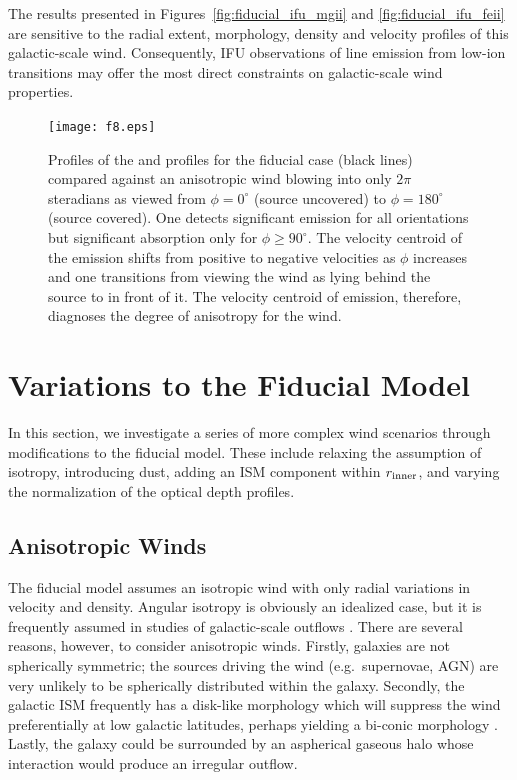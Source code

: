 \documentclass[]{emulateapj}
\begin{document}
The results presented in Figures~\ref{fig:fiducial_ifu_mgii} and
\ref{fig:fiducial_ifu_feii} are sensitive to the radial extent,
morphology, density and velocity profiles of this galactic-scale
wind.  Consequently, IFU observations of line emission from low-ion
transitions may offer the most direct constraints on galactic-scale
wind properties. 

\begin{figure}
\texttt{[image: f8.eps]}
\caption{
Profiles of the  and  profiles for the fiducial
case (black lines) compared against an anisotropic wind blowing into
only $2\pi$ steradians as viewed from $\phi = 0^\circ$ (source
uncovered) to $\phi = 180^\circ$ (source covered).  One detects
significant emission for all orientations but significant
absorption only for $\phi \ge 90^\circ$.
The velocity centroid of the 
emission shifts from positive to negative velocities as $\phi$
increases and one transitions from viewing the wind as lying behind the
source to in front of it.  The velocity centroid of emission, therefore,
diagnoses the degree of anisotropy for the wind.
}
\label{fig:anisotropic}
\end{figure}


\section{Variations to the Fiducial Model}
\label{sec:variants}

In this section, we investigate a series of more complex wind
scenarios
through modifications to the fiducial model.  These include relaxing
the assumption of isotropy, introducing dust, adding an ISM
component within $r_{\rm inner}$, and varying the normalization of the
optical depth profiles.

\subsection{Anisotropic Winds}
\label{sec:anisotropic}

The fiducial model assumes an
isotropic wind with only radial variations in velocity and density. 
Angular isotropy is obviously an idealized case, but
it is frequently assumed in studies of galactic-scale outflows
\citep[e.g.][]{steidel+10}.   There are several reasons, however, to
consider anisotropic winds.  Firstly, galaxies are not spherically
symmetric;  the sources driving the
wind (e.g.\ supernovae, AGN) are very unlikely to be spherically distributed
within the galaxy.  
Secondly, the galactic ISM frequently has a disk-like morphology
which will suppress the wind preferentially at low galactic latitudes,
perhaps yielding a bi-conic morphology \citep[e.g.][]{ham90,wws02}.
Lastly, the galaxy could be surrounded by an
aspherical gaseous halo whose interaction would produce an irregular 
outflow.
\end{document}
